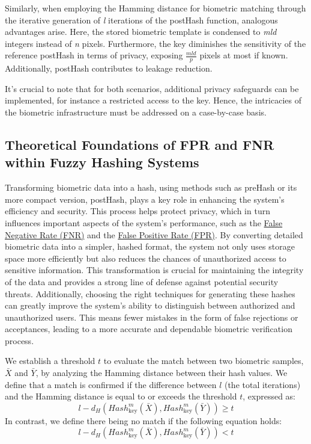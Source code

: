 Similarly, when employing the Hamming distance for biometric matching through the iterative generation of \textit{l} iterations of the postHash function, analogous advantages arise. Here, the stored biometric template is condensed to \textit{mld} integers instead of \textit{n} pixels. Furthermore, the key diminishes the sensitivity of the reference postHash in terms of privacy, exposing \(\frac{mld}{p}\) pixels at most if known. Additionally, postHash contributes to leakage reduction.

It's crucial to note that for both scenarios, additional privacy safeguards can be implemented, for instance a restricted access to the key. Hence, the intricacies of the biometric infrastructure must be addressed on a case-by-case basis.

\subsection{Theoretical Foundations of FPR and FNR within Fuzzy Hashing Systems}

Transforming biometric data into a hash, using methods such as preHash or its more compact version, postHash, plays a key role in enhancing the system's efficiency and security. This process helps protect privacy, which in turn influences important aspects of the system's performance, such as the \hyperref[def:FNR]{False Negative Rate (FNR)} and the \hyperref[def:FPR]{False Positive Rate (FPR)}. By converting detailed biometric data into a simpler, hashed format, the system not only uses storage space more efficiently but also reduces the chances of unauthorized access to sensitive information. This transformation is crucial for maintaining the integrity of the data and provides a strong line of defense against potential security threats. Additionally, choosing the right techniques for generating these hashes can greatly improve the system's ability to distinguish between authorized and unauthorized users. This means fewer mistakes in the form of false rejections or acceptances, leading to a more accurate and dependable biometric verification process.

We establish a threshold \(t\) to evaluate the match between two biometric samples, \(\bar{X}\) and \(\bar{Y}\), by analyzing the Hamming distance between their hash values.
We define that a match is confirmed if the difference between \(l\) (the total iterations) and the Hamming distance is equal to or exceeds the threshold \(t\), expressed as: \[l - d_H(Hash_{\text{key}}^m(\bar{X}), Hash_{\text{key}}^m(\bar{Y})) \geq t\]
In contrast, we define there being no match if the following equation holds: \[l - d_H(Hash_{\text{key}}^m(\bar{X}), Hash_{\text{key}}^m(\bar{Y})) < t\]

